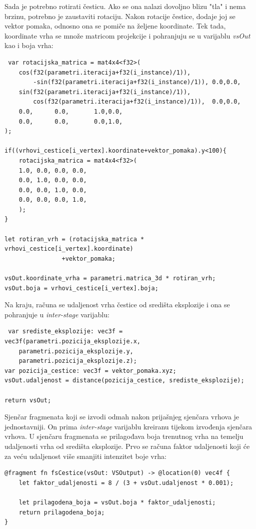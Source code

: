 \documentclass{foi}
\begin{document}
Sada je potrebno rotirati česticu. Ako se ona nalazi dovoljno blizu "tla" i nema brzinu, potrebno je zaustaviti rotaciju. Nakon rotacije čestice, dodaje joj se vektor pomaka, odnosno ona se pomiče na željene koordinate. Tek tada, koordinate vrha se množe matricom projekcije i pohranjuju se u varijablu \textit{vsOut} kao i boja vrha:
\begin{verbatim}
 var rotacijska_matrica = mat4x4<f32>(
	cos(f32(parametri.iteracija+f32(i_instance)/1)),
		-sin(f32(parametri.iteracija+f32(i_instance)/1)), 0.0,0.0,
	sin(f32(parametri.iteracija+f32(i_instance)/1)),
		cos(f32(parametri.iteracija+f32(i_instance)/1)),  0.0,0.0,
	0.0,      0.0,       1.0,0.0,
	0.0,      0.0,       0.0,1.0,
);

if((vrhovi_cestice[i_vertex].koordinate+vektor_pomaka).y<100){
	rotacijska_matrica = mat4x4<f32>(
	1.0, 0.0, 0.0, 0.0,
	0.0, 1.0, 0.0, 0.0,
	0.0, 0.0, 1.0, 0.0,
	0.0, 0.0, 0.0, 1.0,
	);
}

let rotiran_vrh = (rotacijska_matrica *  vrhovi_cestice[i_vertex].koordinate)
				+vektor_pomaka;
				
vsOut.koordinate_vrha = parametri.matrica_3d * rotiran_vrh;
vsOut.boja = vrhovi_cestice[i_vertex].boja;
\end{verbatim}

Na kraju, računa se udaljenost vrha čestice od središta eksplozije i ona se pohranjuje u \textit{inter-stage} varijablu:

\begin{verbatim}
 var srediste_eksplozije: vec3f = vec3f(parametri.pozicija_eksplozije.x,
	parametri.pozicija_eksplozije.y,
	parametri.pozicija_eksplozije.z);
var pozicija_cestice: vec3f = vektor_pomaka.xyz;
vsOut.udaljenost = distance(pozicija_cestice, srediste_eksplozije);

return vsOut;
\end{verbatim}

Sjenčar fragmenata koji se izvodi odmah nakon prijašnjeg sjenčara vrhova je jednostavniji. On prima \textit{inter-stage} varijablu kreiranu tijekom izvođenja sjenčara vrhova. U sjenčaru fragmenata se prilagođava boja trenutnog vrha na temelju udaljenosti vrha od središta eksplozije. Prvo se računa faktor udaljenosti koji će za veću udaljenost više smanjiti intenzitet boje vrha:

\begin{verbatim}
@fragment fn fsCestice(vsOut: VSOutput) -> @location(0) vec4f {
	let faktor_udaljenosti = 8 / (3 + vsOut.udaljenost * 0.001);
	
	let prilagodena_boja = vsOut.boja * faktor_udaljenosti;
	return prilagodena_boja;
}
\end{verbatim}
\end{document}
